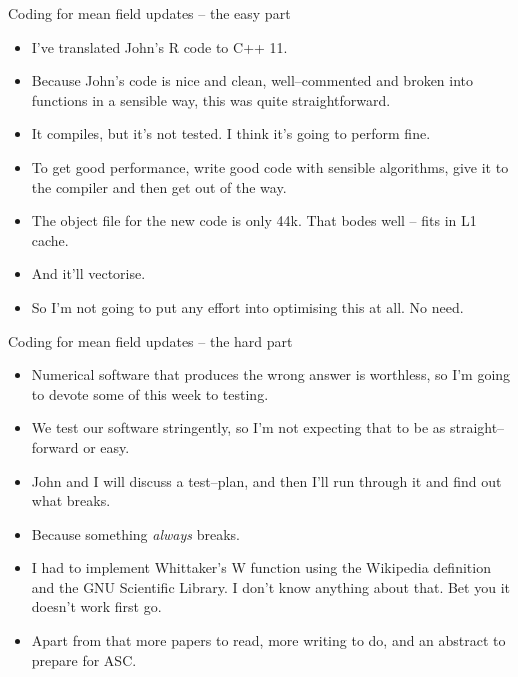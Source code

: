 \documentclass{beamer}
\begin{document}
\begin{frame}{Coding for mean field updates -- the easy part}
\begin{itemize}
\item I've translated John's R code to C++ 11.
\item Because John's code is nice and clean, well--commented 
and broken into functions in a sensible way, this was quite straightforward.
\item It compiles, but it's not tested. I think it's going to perform fine.
\item To get good performance, write good code with sensible algorithms, give it to the compiler and then
get out of the way.
\item The object file for the new code is only 44k. That bodes well -- fits in L1 cache.
\item And it'll vectorise.
\item So I'm not going to put any effort into optimising this at all. No need.
\end{itemize}
\end{frame}

\begin{frame}{Coding for mean field updates -- the hard part}
\begin{itemize}
\item Numerical software that produces the wrong answer is worthless, so I'm going to devote some of this week
to testing.
\item We test our software stringently, so I'm not expecting that to be
as straight--forward or easy.
\item John and I will discuss a test--plan, and then I'll run through it and find 
out what breaks.
\item Because something \emph{always} breaks.
\item I had to implement Whittaker's W function using the Wikipedia definition and the GNU Scientific
Library. I don't know anything about that. Bet you it doesn't work first go.
\item Apart from that more papers to read, more writing to do, and an abstract to prepare for ASC.
\end{itemize}
\end{frame}
\end{document}
